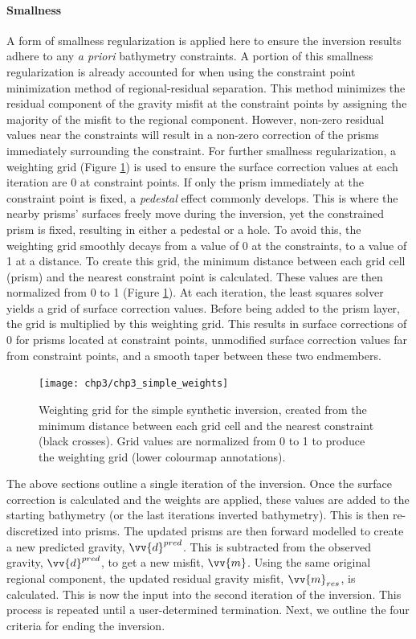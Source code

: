 \paragraph*{Smallness}
A form of smallness regularization is applied here to ensure the inversion results adhere to any \textit{a priori} bathymetry constraints. A portion of this smallness regularization is already accounted for when using the constraint point minimization method of regional-residual separation. This method minimizes the residual component of the gravity misfit at the constraint points by assigning the majority of the misfit to the regional component. However, non-zero residual values near the constraints will result in a non-zero correction of the prisms immediately surrounding the constraint. For further smallness regularization, a weighting grid (Figure \ref{fig:chp3_simple_weights}) is used to ensure the surface correction values at each iteration are 0 at constraint points. If only the prism immediately at the constraint point is fixed, a \textit{pedestal} effect commonly develops. This is where the nearby prisms' surfaces freely move during the inversion, yet the constrained prism is fixed, resulting in either a pedestal or a hole. To avoid this, the weighting grid smoothly decays from a value of 0 at the constraints, to a value of 1 at a distance. To create this grid, the minimum distance between each grid cell (prism) and the nearest constraint point is calculated. These values are then normalized from 0 to 1 (Figure \ref{fig:chp3_simple_weights}). At each iteration, the least squares solver yields a grid of surface correction values. Before being added to the prism layer, the grid is multiplied by this weighting grid. This results in surface corrections of 0 for prisms located at constraint points, unmodified surface correction values far from constraint points, and a smooth taper between these two endmembers. \\

\begin{figure}[!ht]
    \centering
    \texttt{[image: chp3/chp3\_simple\_weights]}
    \caption[Weighting grid for the simple synthetic inversion]{Weighting grid for the simple synthetic inversion, created from the minimum distance between each grid cell and the nearest constraint (black crosses). Grid values are normalized from 0 to 1 to produce the weighting grid (lower colourmap annotations).}
    \label{fig:chp3_simple_weights}
\end{figure}

The above sections outline a single iteration of the inversion. Once the surface correction is calculated and the weights are applied, these values are added to the starting bathymetry (or the last iterations inverted bathymetry). This is then re-discretized into prisms. The updated prisms are then forward modelled to create a new predicted gravity, $\vv{d}^{pred}$. This is subtracted from the observed gravity, $\vv{d}^{pred}$, to get a new misfit, $\vv{m}$. Using the same original regional component, the updated residual gravity misfit, $\vv{m}_{res}$, is calculated. This is now the input into the second iteration of the inversion. This process is repeated until a user-determined termination. Next, we outline the four criteria for ending the inversion. 

